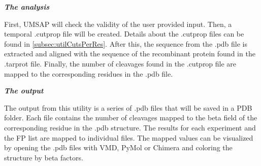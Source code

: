 \textit{\textbf{The analysis}}

First, UMSAP will check the validity of the user provided input. Then, a temporal .cutprop file will be created. Details about the .cutprop files can be found in \autoref{subsec:utilCutsPerRes}. After this, the sequence from the .pdb file is extracted and aligned with the sequence of the recombinant protein found in the .tarprot file. Finally, the number of cleavages found in the .cutprop file are mapped to the corresponding residues in the .pdb file.

\textit{\textbf{The output}}

The output from this utility is a series of .pdb files that will be saved in a PDB folder. Each file contains the number of cleavages mapped to the beta field of the corresponding residue in the .pdb structure. The results for each experiment and the FP list are mapped to individual files. The mapped values can be visualized by opening the .pdb files with VMD, PyMol or Chimera and coloring the structure by beta factors.




